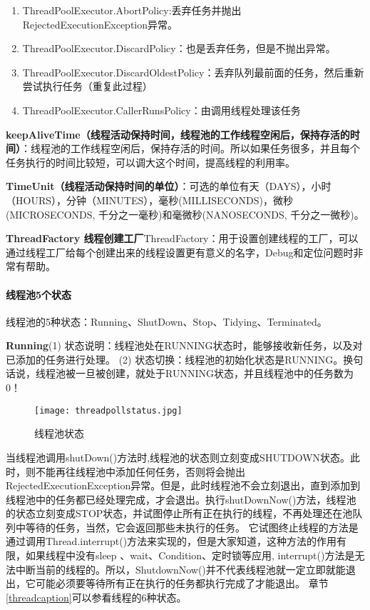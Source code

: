 \documentclass[../../../interview-questions.tex]{subfiles}
\begin{document}
\begin{enumerate}
    \item {ThreadPoolExecutor.AbortPolicy:丢弃任务并抛出RejectedExecutionException异常。}
    \item {ThreadPoolExecutor.DiscardPolicy：也是丢弃任务，但是不抛出异常。}
    \item {ThreadPoolExecutor.DiscardOldestPolicy：丢弃队列最前面的任务，然后重新尝试执行任务（重复此过程）}
    \item {ThreadPoolExecutor.CallerRunsPolicy：由调用线程处理该任务}
\end{enumerate}

\textbf{keepAliveTime（线程活动保持时间，线程池的工作线程空闲后​​​，​​保持存活的时间​​​）}：线程池的工作线程空闲后，保持存活的时间。所以如果任务很多，并且每个任务执行的时间比较短，可以调大这个时间，提高线程的利用率。

\textbf{TimeUnit（线程活动保持时间的单位）}：可选的单位有天（DAYS），小时（HOURS），分钟（MINUTES），毫秒(MILLISECONDS)，微秒(MICROSECONDS, 千分之一毫秒)和毫微秒(NANOSECONDS, 千分之一微秒)。

\textbf{ThreadFactory 线程创建工厂}ThreadFactory：用于设置创建线程的工厂，可以通过线程工厂给每个创建出来的线程设置更有意义的名字，Debug和定位问题时非常有帮助。

\paragraph{线程池5个状态}\label{threadpoolcaption}

线程池的5种状态：Running、ShutDown、Stop、Tidying、Terminated。

\textbf{Running}(1) 状态说明：线程池处在RUNNING状态时，能够接收新任务，以及对已添加的任务进行处理。
(2) 状态切换：线程池的初始化状态是RUNNING。换句话说，线程池被一旦被创建，就处于RUNNING状态，并且线程池中的任务数为0！

\begin{figure}[htbp]
	\centering
	\texttt{[image: threadpollstatus.jpg]}
	\caption{线程池状态}
	\label{fig:threadpollstatus}
\end{figure}

当线程池调用shutDown()方法时,线程池的状态则立刻变成SHUTDOWN状态。此时，则不能再往线程池中添加任何任务，否则将会抛出RejectedExecutionException异常。但是，此时线程池不会立刻退出，直到添加到线程池中的任务都已经处理完成，才会退出。执行shutDownNow()方法，线程池的状态立刻变成STOP状态，并试图停止所有正在执行的线程，不再处理还在池队列中等待的任务，当然，它会返回那些未执行的任务。 
它试图终止线程的方法是通过调用Thread.interrupt()方法来实现的，但是大家知道，这种方法的作用有限，如果线程中没有sleep 、wait、Condition、定时锁等应用, interrupt()方法是无法中断当前的线程的。所以，ShutdownNow()并不代表线程池就一定立即就能退出，它可能必须要等待所有正在执行的任务都执行完成了才能退出。 章节\ref{threadcaption}可以参看线程的6种状态。
\end{document}

